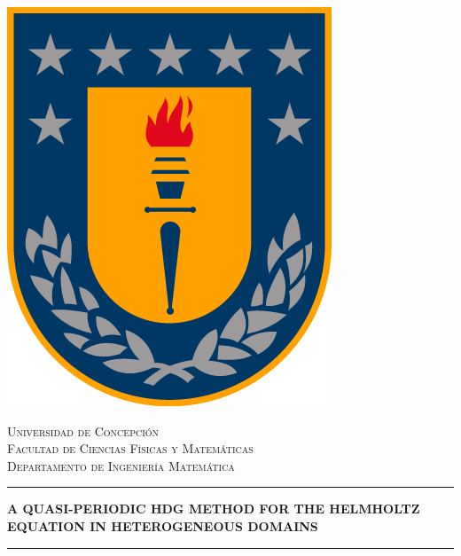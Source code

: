 \documentclass[11pt,letterpaper,hidelinks]{book}
\begin{document}
\begin{titlepage}
\begin{center}
\includegraphics[scale=0.3]{img/esc.png} 
\end{center}
\newcommand{\HRule}{\rule{\linewidth}{0.5mm}} %
\center %
\textsc{\Large Universidad de Concepci\'on}\\ %
\textsc{\large Facultad de Ciencias F\'isicas y Matem\'aticas}\\
\textsc{\large Departamento de Ingenier\'ia Matem\'atica}\\[2cm]
\begin{center}
\hrule
\vspace{0.5cm}
{\bf \Large A QUASI-PERIODIC HDG METHOD FOR THE HELMHOLTZ EQUATION IN HETEROGENEOUS DOMAINS}
\vspace{0.5cm}
\hrule
\end{center}

\end{titlepage}
\end{document}
